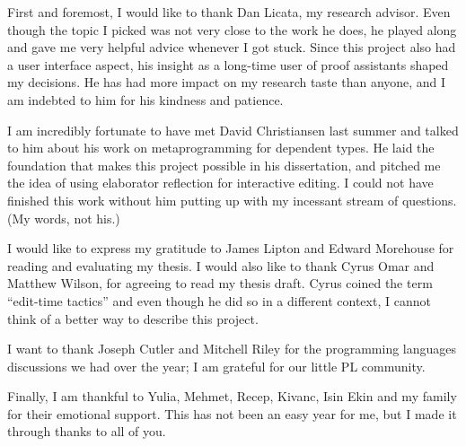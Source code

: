 \documentclass[11pt, ma]{westhesis}
\theoremstyle{plain}
\theoremstyle{definition}
\numberwithin{section}{chapter}
\numberwithin{figure}{chapter}
\begin{document}
\begin{acknowledgements}
First and foremost, I would like to thank Dan Licata, my research advisor.
Even though the topic I picked was not very close to the work he does, he
played along and gave me very helpful advice whenever I got stuck.
Since this project also had a user interface aspect, his insight as a
long-time user of proof assistants shaped my decisions.
He has had more impact on my research taste than anyone, and I am indebted to
him for his kindness and patience.

I am incredibly fortunate to have met David Christiansen last summer and talked
to him about his work on metaprogramming for dependent types.
He laid the foundation that makes this project possible in his
dissertation\cite{davidphd}, and pitched me the idea of using elaborator
reflection for interactive editing.
I could not have finished this work without him putting up with my incessant
stream of questions. (My words, not his.)

I would like to express my gratitude to James Lipton and Edward Morehouse for
reading and evaluating my thesis. I would also like to thank Cyrus Omar and
Matthew Wilson, for agreeing to read my thesis draft. Cyrus coined the term
``edit-time tactics'' and even though he did so in a different
context\cite{hazelnut}, I cannot think of a better way to describe this
project.

I want to thank Joseph Cutler and Mitchell Riley for the programming languages
discussions we had over the year; I am grateful for our little PL community.

Finally, I am thankful to Yulia, Mehmet, Recep, Kivanc, Isin Ekin and
my family for their emotional support. This has not been an easy year for me,
but I made it through thanks to all of you.
\end{acknowledgements}

\frontmatter
\maketitle
\makeabstract
\makededication
\makeack

\tableofcontents

\newcommand{\nocontentsline}[3]{}
\bgroup\let\addcontentsline=\nocontentsline
\renewcommand\numberline[1]{#1.\ }
\listoffigures
\egroup

\mainmatter












\end{document}
